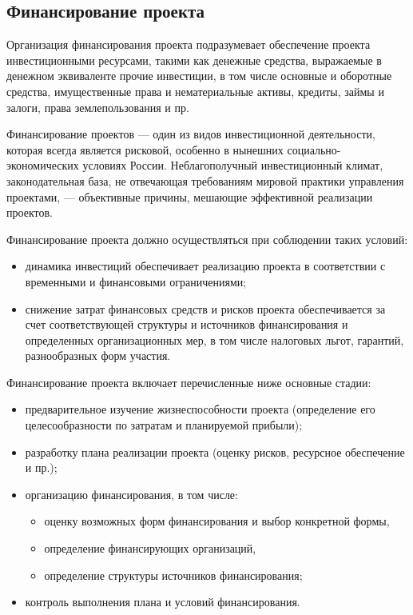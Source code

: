 \subsection{Финансирование проекта}

Организация финансирования проекта подразумевает обеспечение проекта инвестиционными ресурсами, такими как денежные средства, выражаемые в денежном эквиваленте прочие инвестиции, в том числе основные и оборотные средства, имущественные права и нематериальные активы, кредиты, займы и залоги, права землепользования и пр.

Финансирование проектов --- один из видов инвестиционной деятельности, которая всегда является рисковой, особенно в нынешних социально-экономических условиях России.
Неблагополучный инвестиционный климат, законодательная база, не отвечающая требованиям мировой практики управления проектами, --- объективные причины, мешающие эффективной реализации проектов.

Финансирование проекта должно осуществляться при соблюдении таких условий:
\begin{itemize}
	\item динамика инвестиций обеспечивает реализацию проекта в соответствии с временными и финансовыми ограничениями;
	\item снижение затрат финансовых средств и рисков проекта обеспечивается за счет соответствующей структуры и источников финансирования и определенных организационных мер, в том числе налоговых льгот, гарантий, разнообразных форм участия.
\end{itemize}

Финансирование проекта включает перечисленные ниже основные стадии:
\begin{itemize}
	\item  предварительное изучение жизнеспособности проекта (определение его целесообразности по затратам и планируемой прибыли);
	\item  разработку плана реализации проекта (оценку рисков, ресурсное обеспечение и пр.);
	\item  организацию финансирования, в том числе:
	\begin{itemize}
		\item  оценку возможных форм финансирования и выбор конкретной формы,
		\item  определение финансирующих организаций,
		\item  определение структуры источников финансирования;
	\end{itemize}
	\item  контроль выполнения плана и условий финансирования.
\end{itemize}

